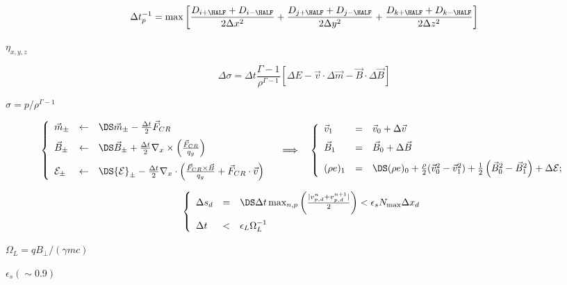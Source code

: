 \documentclass{article}
\begin{document}
\[ \Delta t_{p}^{-1} = 
    \max\left[\frac{D_{i+\HALF} + D_{i-\HALF}}{2\Delta x^2} +
              \frac{D_{j+\HALF} + D_{j-\HALF}}{2\Delta y^2} +
              \frac{D_{k+\HALF} + D_{k-\HALF}}{2\Delta z^2}\right]
\]
\pagebreak

$\eta_{x,y,z}$
\pagebreak

\[         \Delta\sigma = \Delta t\frac{\Gamma-1}{\rho^{\Gamma-1}}
                        \left[\Delta E - \vec{v}\cdot\Delta\vec{m}
                                       - \vec{B}\cdot\Delta{\vec{B}}
                                       \right]
\]
\pagebreak

$\sigma = p/\rho^{\Gamma-1}$
\pagebreak

\[   \left\{\begin{array}{lcl}
     \vec{m}_\pm &\leftarrow& \DS
     \vec{m}_\pm - \frac{\Delta t}{2}\vec{F}_{CR}
     \\ \noalign{\medskip}
     \vec{B}_\pm &\leftarrow& \DS
     \vec{B}_\pm + \frac{\Delta t}{2}\nabla_x\times
                   \left(\frac{\vec{F}_{CR}}{q_g}\right)
     \\ \noalign{\medskip}
     {\cal E}_\pm &\leftarrow& \DS
     {\cal E}_\pm - \frac{\Delta t}{2}\nabla_x\cdot
     \left(\frac{\vec{F}_{CR}\times\vec{B}}{q_g} + \vec{F}_{CR}\cdot\vec{v}\right)
   \end{array}\right.
   \quad\Longrightarrow\quad
   \left\{\begin{array}{lcl}
     \vec{v}_1  &=& \vec{v}_0 + \Delta\vec{v}
     \\ \noalign{\medskip}
     \vec{B}_1  &=& \vec{B}_0 + \Delta\vec{B}
     \\ \noalign{\medskip}
     (\rho e)_1 &=& \DS (\rho e)_0 + \frac{\rho}{2}(\vec{v}_0^2 - \vec{v}_1^2)
     + \frac{1}{2}\left(\vec{B}_0^2-\vec{B}_1^2\right) + \Delta {\cal E};
   \end{array}\right.
\]
\pagebreak

\[ \left\{
   \begin{array}{lcl}
     \Delta s_d &=& \DS\Delta t\max_{n,p}\left(
                    \frac{|v_{p,d}^n + v_{p,d}^{n+1}|}{2}\right)
                 < \epsilon_s N_{\max}\Delta x_d \\ \noalign{\medskip}
     \Delta t  &<& \epsilon_L \Omega_L^{-1}
   \end{array}
 \right.
\]
\pagebreak

$ \Omega_L = qB_\perp/(\gamma m c) $
\pagebreak

$\epsilon_s (\sim 0.9)$
\pagebreak
\end{document}
